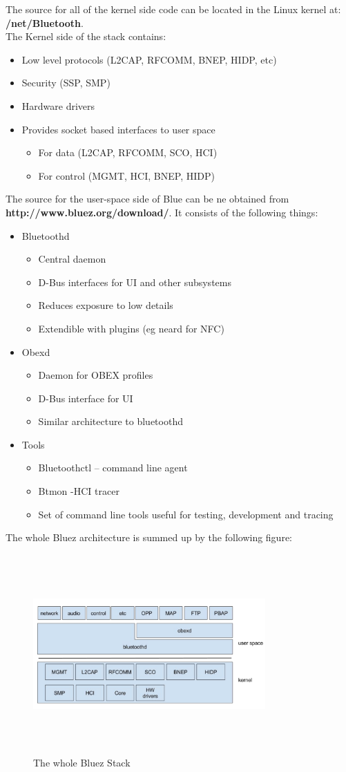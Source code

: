 The source for all of the kernel side code can be located in the Linux kernel at: \textbf{/net/Bluetooth}.\\
The Kernel side of the stack contains:
\begin{itemize}
	\item Low level protocols (L2CAP, RFCOMM, BNEP, HIDP, etc)
	\item Security (SSP, SMP)
	\item Hardware drivers
	\item Provides socket based interfaces to user space
	\begin{itemize}
		\item For data (L2CAP, RFCOMM, SCO, HCI)
		\item For control (MGMT, HCI, BNEP, HIDP)
	\end{itemize}
\end{itemize}
The source for the user-space side of Blue can be ne obtained from \textbf{http://www.bluez.org/download/}. It consists of the following things:
\begin{itemize}
	\item Bluetoothd
	\begin{itemize}
		\item Central daemon
		\item D-Bus interfaces for UI and other subsystems
		\item Reduces exposure to low details
		\item Extendible with plugins (eg neard for NFC)
	\end{itemize}
	\item Obexd
	\begin{itemize}
		\item Daemon for OBEX profiles
		\item D-Bus interface for UI
		\item Similar architecture to bluetoothd
	\end{itemize}
	\item Tools
	\begin{itemize}	
		\item Bluetoothctl – command line agent
		\item Btmon -HCI tracer
		\item Set of command line tools useful for testing, development and tracing
	\end{itemize}
\end{itemize}
The whole Bluez architecture is summed up by the following figure:
\begin{figure}[ht]
	\centering
	\includegraphics[width=3.5in, height=3in]{images/whole_bluez.png}
	\caption{The whole Bluez Stack}
\end{figure}

